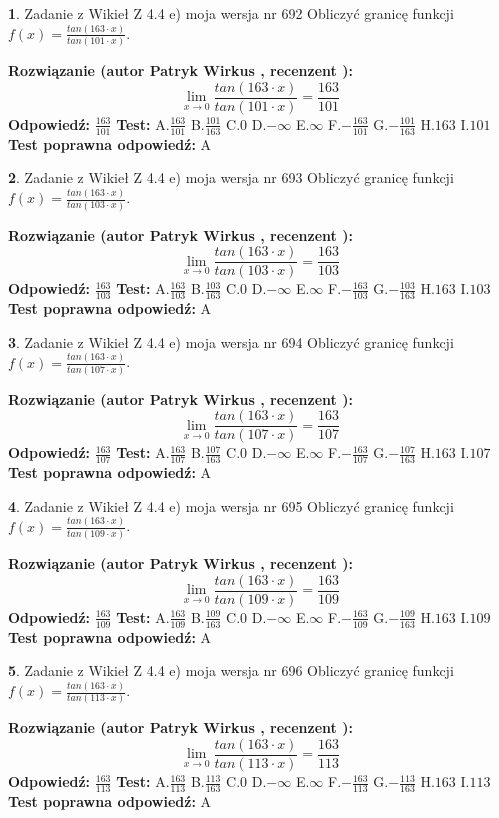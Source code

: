 \documentclass[12pt, a4paper]{article}
\theoremstyle{definition} %
\newtheorem{zad}{}
\newcommand{\zadStart}[1]{\begin{zad}#1\newline}
\newcommand{\zadStop}{\end{zad}}
\newcommand{\rozwStart}[2]{\noindent \textbf{Rozwiązanie (autor #1 , recenzent #2): }\newline}
\newcommand{\rozwStop}{\newline}
\newcommand{\odpStart}{\noindent \textbf{Odpowiedź:}\newline}
\newcommand{\odpStop}{\newline}
\newcommand{\testStart}{\noindent \textbf{Test:}\newline}
\newcommand{\testStop}{\newline}
\newcommand{\kluczStart}{\noindent \textbf{Test poprawna odpowiedź:}\newline}
\newcommand{\kluczStop}{\newline}
\begin{document}
\zadStart{Zadanie z Wikieł Z 4.4 e) moja wersja nr 692}
Obliczyć granicę funkcji $f(x)=\frac{tan(163\cdot x)}{tan(101\cdot x)}$.
\zadStop
\rozwStart{Patryk Wirkus}{}
$$\lim\limits_{x\to 0}\frac{tan(163\cdot x)}{tan(101\cdot x)}=
\frac{163}{101}$$
\rozwStop
\odpStart
$\frac{163}{101}$
\odpStop
\testStart
A.$\frac{163}{101}$
B.$\frac{101}{163}$
C.$0$
D.$-\infty$
E.$\infty$
F.$-\frac{163}{101}$
G.$-\frac{101}{163}$
H.$163$
I.$101$
\testStop
\kluczStart
A
\kluczStop



\zadStart{Zadanie z Wikieł Z 4.4 e) moja wersja nr 693}
Obliczyć granicę funkcji $f(x)=\frac{tan(163\cdot x)}{tan(103\cdot x)}$.
\zadStop
\rozwStart{Patryk Wirkus}{}
$$\lim\limits_{x\to 0}\frac{tan(163\cdot x)}{tan(103\cdot x)}=
\frac{163}{103}$$
\rozwStop
\odpStart
$\frac{163}{103}$
\odpStop
\testStart
A.$\frac{163}{103}$
B.$\frac{103}{163}$
C.$0$
D.$-\infty$
E.$\infty$
F.$-\frac{163}{103}$
G.$-\frac{103}{163}$
H.$163$
I.$103$
\testStop
\kluczStart
A
\kluczStop



\zadStart{Zadanie z Wikieł Z 4.4 e) moja wersja nr 694}
Obliczyć granicę funkcji $f(x)=\frac{tan(163\cdot x)}{tan(107\cdot x)}$.
\zadStop
\rozwStart{Patryk Wirkus}{}
$$\lim\limits_{x\to 0}\frac{tan(163\cdot x)}{tan(107\cdot x)}=
\frac{163}{107}$$
\rozwStop
\odpStart
$\frac{163}{107}$
\odpStop
\testStart
A.$\frac{163}{107}$
B.$\frac{107}{163}$
C.$0$
D.$-\infty$
E.$\infty$
F.$-\frac{163}{107}$
G.$-\frac{107}{163}$
H.$163$
I.$107$
\testStop
\kluczStart
A
\kluczStop



\zadStart{Zadanie z Wikieł Z 4.4 e) moja wersja nr 695}
Obliczyć granicę funkcji $f(x)=\frac{tan(163\cdot x)}{tan(109\cdot x)}$.
\zadStop
\rozwStart{Patryk Wirkus}{}
$$\lim\limits_{x\to 0}\frac{tan(163\cdot x)}{tan(109\cdot x)}=
\frac{163}{109}$$
\rozwStop
\odpStart
$\frac{163}{109}$
\odpStop
\testStart
A.$\frac{163}{109}$
B.$\frac{109}{163}$
C.$0$
D.$-\infty$
E.$\infty$
F.$-\frac{163}{109}$
G.$-\frac{109}{163}$
H.$163$
I.$109$
\testStop
\kluczStart
A
\kluczStop



\zadStart{Zadanie z Wikieł Z 4.4 e) moja wersja nr 696}
Obliczyć granicę funkcji $f(x)=\frac{tan(163\cdot x)}{tan(113\cdot x)}$.
\zadStop
\rozwStart{Patryk Wirkus}{}
$$\lim\limits_{x\to 0}\frac{tan(163\cdot x)}{tan(113\cdot x)}=
\frac{163}{113}$$
\rozwStop
\odpStart
$\frac{163}{113}$
\odpStop
\testStart
A.$\frac{163}{113}$
B.$\frac{113}{163}$
C.$0$
D.$-\infty$
E.$\infty$
F.$-\frac{163}{113}$
G.$-\frac{113}{163}$
H.$163$
I.$113$
\testStop
\kluczStart
A
\kluczStop
\end{document}
